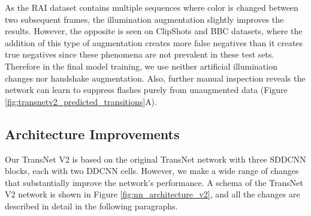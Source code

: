 As the RAI dataset contains multiple sequences where color is changed between two subsequent frames, the illumination augmentation slightly improves the results. However, the opposite is seen on ClipShots and BBC datasets, where the addition of this type of augmentation creates more false negatives than it creates true negatives since these phenomena are not prevalent in these test sets.
Therefore in the final model training, we use neither artificial illumination changes nor handshake augmentation. Also, further manual inspection reveals the network can learn to suppress flashes purely from unaugmented data (Figure \ref{fig:transnetv2_predicted_transitions}A).




\subsection{Architecture Improvements}
Our TransNet V2 is based on the original TransNet network with three SDDCNN blocks, each with two DDCNN cells. However, we make a wide range of changes that substantially improve the network's performance. A schema of the TransNet V2 network is shown in Figure \ref{fig:nn_architecture_v2}, and all the changes are described in detail in the following paragraphs.

